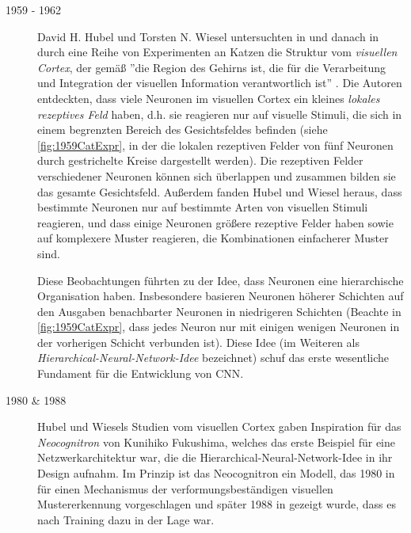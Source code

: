 \begin{description}
	\item[1959 - 1962]
		
	David H. Hubel und Torsten N. Wiesel untersuchten in \cite{PMID:14403678,PMID:14403679} und danach in \cite{PMID:14449617} durch eine Reihe von Experimenten an Katzen die Struktur vom \emph{visuellen Cortex}, der gemäß \cite{Bergua2017} ''die Region des Gehirns ist, die für die Verarbeitung und Integration der visuellen Information verantwortlich ist'' . Die Autoren entdeckten, dass viele Neuronen im visuellen Cortex ein kleines \emph{lokales rezeptives Feld} haben, d.h. sie reagieren nur auf visuelle Stimuli, die sich in einem begrenzten Bereich des Gesichtsfeldes befinden (siehe \autoref{fig:1959CatExpr}, in der die lokalen rezeptiven Felder von fünf Neuronen durch gestrichelte Kreise dargestellt werden). Die rezeptiven Felder verschiedener Neuronen können sich überlappen und zusammen bilden sie das gesamte Gesichtsfeld. Außerdem fanden Hubel und Wiesel heraus, dass bestimmte Neuronen nur auf bestimmte Arten von visuellen Stimuli reagieren, und dass einige Neuronen größere rezeptive Felder haben sowie auf komplexere Muster reagieren, die Kombinationen einfacherer Muster sind. 
	
	Diese Beobachtungen führten zu der Idee, dass Neuronen eine hierarchische Organisation haben. Insbesondere basieren Neuronen höherer Schichten auf den Ausgaben benachbarter Neuronen in niedrigeren Schichten (Beachte in \autoref{fig:1959CatExpr}, dass jedes Neuron nur mit einigen wenigen Neuronen in der vorherigen Schicht verbunden ist). Diese Idee (im Weiteren als \emph{Hierarchical-Neural-Network-Idee} bezeichnet) schuf das erste wesentliche Fundament für die Entwicklung von CNN.
		
	\item[1980 \& 1988] 
	
	Hubel und Wiesels Studien vom visuellen Cortex gaben Inspiration für das \emph{Neocognitron} von Kunihiko Fukushima, welches das erste Beispiel für eine Netzwerkarchitektur war, die die Hierarchical-Neural-Network-Idee in ihr Design aufnahm. Im Prinzip ist das Neocognitron ein Modell, das 1980 in \cite{Neocognitron1980} für einen Mechanismus der verformungsbeständigen visuellen Mustererkennung vorgeschlagen und später 1988 in \cite{Neocognitron1988} gezeigt wurde, dass es nach Training dazu in der Lage war.
	

\end{description}
